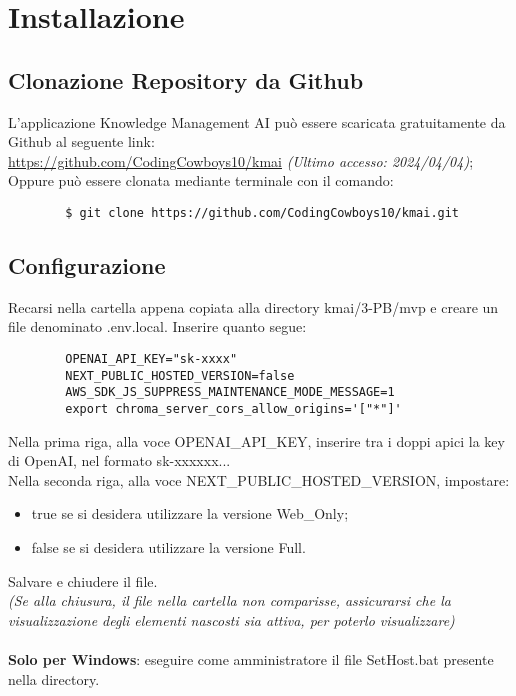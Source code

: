 \chapter{Installazione} \label{cap:Inst}
\section{Clonazione Repository da Github}
L'applicazione Knowledge Management AI può essere scaricata gratuitamente da Github al seguente link: \\ \url{https://github.com/CodingCowboys10/kmai} \textit{(Ultimo accesso: 2024/04/04)}; \\
Oppure può essere clonata mediante terminale con il comando:
    \begin{lstlisting}
        $ git clone https://github.com/CodingCowboys10/kmai.git
    \end{lstlisting}

\section{Configurazione}
Recarsi nella cartella appena copiata alla  directory kmai/3-PB/mvp e creare un file denominato .env.local. Inserire quanto segue:
    \begin{lstlisting}
        OPENAI_API_KEY="sk-xxxx"
        NEXT_PUBLIC_HOSTED_VERSION=false
        AWS_SDK_JS_SUPPRESS_MAINTENANCE_MODE_MESSAGE=1
        export chroma_server_cors_allow_origins='["*"]'
    \end{lstlisting}
Nella prima riga, alla voce OPENAI\_API\_KEY, inserire tra i doppi apici la key di OpenAI, nel formato sk-xxxxxx...\\
Nella seconda riga, alla voce NEXT\_PUBLIC\_HOSTED\_VERSION, impostare:
\vspace{-0.3cm}
\begin{itemize}[itemsep=-2pt]
    \item true se si desidera utilizzare la versione Web\_Only;
    \item false se si desidera utilizzare la versione Full.
\end{itemize}
\vspace{-0.3cm}
Salvare e chiudere il file.\\
\textit{(Se alla chiusura, il file nella cartella non comparisse, assicurarsi che la visualizzazione degli elementi nascosti sia attiva, per poterlo visualizzare)}\\ \\
\textbf{Solo per Windows}: eseguire come amministratore il file SetHost.bat presente nella directory.

